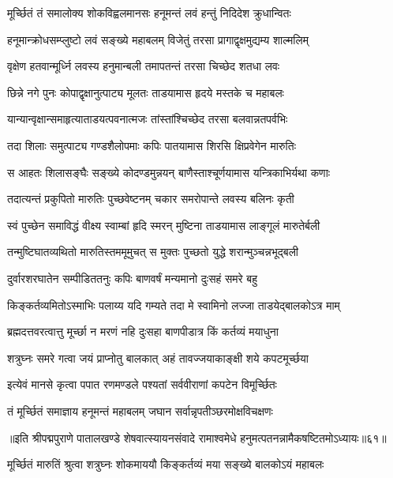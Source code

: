 \twolineshloka
{मूर्च्छितं तं समालोक्य शोकविह्वलमानसः}
{हनूमन्तं लवं हन्तुं निदिदेश क्रुधान्वितः}%

\twolineshloka
{हनूमान्क्रोधसम्प्लुष्टो लवं सङ्ख्ये महाबलम्}
{विजेतुं तरसा प्रागाद्वृक्षमुद्यम्य शाल्मलिम्}%

\twolineshloka
{वृक्षेण हतवान्मूर्ध्नि लवस्य हनुमान्बली}
{तमापतन्तं तरसा चिच्छेद शतधा लवः}%

\twolineshloka
{छिन्ने नगे पुनः कोपाद्वृक्षानुत्पाट्य मूलतः}
{ताडयामास हृदये मस्तके च महाबलः}%

\twolineshloka
{यान्यान्वृक्षान्समाहृत्याताडयत्पवनात्मजः}
{तांस्तांश्चिच्छेद तरसा बलवान्नतपर्वभिः}%

\twolineshloka
{तदा शिलाः समुत्पाट्य गण्डशैलोपमाः कपिः}
{पातयामास शिरसि क्षिप्रवेगेन मारुतिः}%

\twolineshloka
{स आहतः शिलासङ्घैः सङ्ख्ये कोदण्डमुन्नयन्}
{बाणैस्ताश्चूर्णयामास यन्त्रिकाभिर्यथा कणाः}%

\twolineshloka
{तदात्यन्तं प्रकुपितो मारुतिः पुच्छवेष्टनम्}
{चकार समरोपान्ते लवस्य बलिनः कृती}%

\twolineshloka
{स्वं पुच्छेन समाविद्धं वीक्ष्य स्वाम्बां हृदि स्मरन्}
{मुष्टिना ताडयामास लाङ्गूलं मारुतेर्बली}%

\twolineshloka
{तन्मुष्टिघातव्यथितो मारुतिस्तममूमुचत्}
{स मुक्तः पुच्छतो युद्धे शरान्मुञ्चन्नभूद्बली}%

\twolineshloka
{दुर्वारशरघातेन सम्पीडिततनुः कपिः}
{बाणवर्षं मन्यमानो दुःसहं समरे बहु}%

\twolineshloka
{किङ्कर्तव्यमितोऽस्माभिः पलाय्य यदि गम्यते}
{तदा मे स्वामिनो लज्जा ताडयेद्बालकोऽत्र माम्}%

\twolineshloka
{ब्रह्मदत्तवरत्वात्तु मूर्च्छा न मरणं नहि}
{दुःसहा बाणपीडात्र किं कर्तव्यं मयाधुना}%

\twolineshloka
{शत्रुघ्नः समरे गत्वा जयं प्राप्नोतु बालकात्}
{अहं तावज्जयाकाङ्क्षी शये कपटमूर्च्छया}%

\twolineshloka
{इत्येवं मानसे कृत्वा पपात रणमण्डले}
{पश्यतां सर्ववीराणां कपटेन विमूर्च्छितः}%

\twolineshloka
{तं मूर्च्छितं समाज्ञाय हनूमन्तं महाबलम्}
{जघान सर्वान्नृपतीञ्छरमोक्षविचक्षणः}%

॥इति श्रीपद्मपुराणे पातालखण्डे शेषवात्स्यायनसंवादे रामाश्वमेधे हनुमत्पतनन्नामैकषष्टितमोऽध्यायः॥६१॥



\twolineshloka
{मूर्च्छितं मारुतिं श्रुत्वा शत्रुघ्नः शोकमाययौ}
{किङ्कर्तव्यं मया सङ्ख्ये बालकोऽयं महाबलः}%

